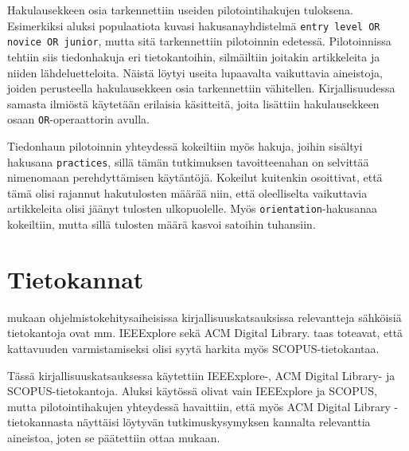 \documentclass[utf8]{gradu3}
\begin{document}
Hakulausekkeen osia tarkennettiin useiden pilotointihakujen tuloksena. Esimerkiksi aluksi populaatiota kuvasi hakusanayhdistelmä {\tt entry level OR novice OR junior}, mutta sitä tarkennettiin pilotoinnin edetessä. Pilotoinnissa tehtiin siis tiedonhakuja eri tietokantoihin, silmäiltiin joitakin artikkeleita ja niiden lähdeluetteloita. Näistä löytyi useita lupaavalta vaikuttavia aineistoja, joiden perusteella hakulausekkeen osia tarkennettiin vähitellen. Kirjallisuudessa samasta ilmiöstä käytetään erilaisia käsitteitä, joita lisättiin hakulausekkeen osaan {\tt OR}-operaattorin avulla.

Tiedonhaun pilotoinnin yhteydessä kokeiltiin myös hakuja, joihin sisältyi hakusana {\tt practices}, sillä tämän tutkimuksen tavoitteenahan on selvittää nimenomaan perehdyttämisen käytäntöjä. Kokeilut kuitenkin osoittivat, että tämä olisi rajannut hakutulosten määrää niin, että oleelliselta vaikuttavia artikkeleita olisi jäänyt tulosten ulkopuolelle. Myös {\tt orientation}-hakusanaa kokeiltiin, mutta sillä tulosten määrä kasvoi satoihin tuhansiin. 

\section{Tietokannat}

\textcite{brereton-ym-2007} mukaan ohjelmistokehitysaiheisissa kirjallisuuskatsauksissa relevantteja sähköisiä tietokantoja ovat mm. IEEExplore sekä ACM Digital Library. \textcite{kitchenham-charters-2007} taas toteavat, että kattavuuden varmistamiseksi olisi syytä harkita myös SCOPUS-tietokantaa.

Tässä kirjallisuuskatsauksessa käytettiin IEEExplore-, ACM Digital Library- ja SCOPUS-tietokantoja. Aluksi käytössä olivat vain IEEExplore ja SCOPUS, mutta pilotointihakujen yhteydessä havaittiin, että myös ACM Digital Library -tietokannasta näyttäisi löytyvän tutkimuskysymyksen kannalta relevanttia aineistoa, joten se päätettiin ottaa mukaan.
\end{document}
